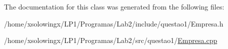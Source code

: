 The documentation for this class was generated from the following files\+:\begin{DoxyCompactItemize}
\item 
/home/xsolowingx/\+L\+P1/\+Programas/\+Lab2/include/questao1/Empresa.\+h\item 
/home/xsolowingx/\+L\+P1/\+Programas/\+Lab2/src/questao1/\hyperlink{Empresa_8cpp}{Empresa.\+cpp}\end{DoxyCompactItemize}
